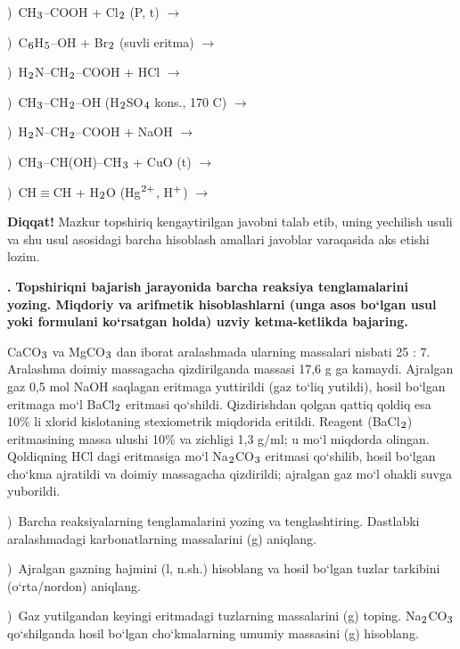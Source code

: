 \documentclass[11pt,a4paper]{article}
\renewcommand{\textsubscript}[1]{\ensuremath{_{\text{\fontsize{8}{8}\selectfont #1}}}}
\renewcommand{\textsuperscript}[1]{\ensuremath{^{\text{\fontsize{8}{8}\selectfont #1}}}}
\newcommand{\qn}[1]{\textbf{\fontsize{11.5}{13}\selectfont #1}}
\newcommand{\qsep}{\par\vspace{13pt}}
\newcommand{\diqqat}[1]{\par\smallskip\noindent\textbf{Diqqat!} #1\par\medskip}
\begin{document}
)\ CH\textsubscript{3}--COOH + Cl\textsubscript{2} (P, t) $\to$\par
{})\ C\textsubscript{6}H\textsubscript{5}--OH + Br\textsubscript{2} (suvli eritma) $\to$\par
{})\ H\textsubscript{2}N--CH\textsubscript{2}--COOH + HCl $\to$\par
{})\ CH\textsubscript{3}--CH\textsubscript{2}--OH (H\textsubscript{2}SO\textsubscript{4} kons., 170 \textdegree{}C) $\to$\par
{})\ H\textsubscript{2}N--CH\textsubscript{2}--COOH + NaOH $\to$\par
{})\ CH\textsubscript{3}--CH(OH)--CH\textsubscript{3} + CuO (t) $\to$\par
{})\ CH$\equiv$CH + H\textsubscript{2}O (Hg\textsuperscript{2+}, H\textsuperscript{+}) $\to$\par
\diqqat{Mazkur topshiriq kengaytirilgan javobni talab etib, uning yechilish usuli va shu usul asosidagi barcha hisoblash amallari javoblar varaqasida aks etishi lozim.}\qsep
\noindent\qn{43.} \textbf{Topshiriqni bajarish jarayonida barcha reaksiya tenglamalarini yozing. Miqdoriy va arifmetik hisoblashlarni (unga asos bo`lgan usul yoki formulani ko`rsatgan holda) uzviy ketma-ketlikda bajaring.}\par\smallskip
CaCO\textsubscript{3} va MgCO\textsubscript{3} dan iborat aralashmada ularning massalari nisbati 25 : 7. Aralashma doimiy massagacha qizdirilganda massasi 17,6 g ga kamaydi. Ajralgan gaz 0,5 mol NaOH saqlagan eritmaga yuttirildi (gaz to`liq yutildi), hosil bo`lgan eritmaga mo`l BaCl\textsubscript{2} eritmasi qo`shildi. Qizdirishdan qolgan qattiq qoldiq esa 10\% li xlorid kislotaning stexiometrik miqdorida eritildi. Reagent (BaCl\textsubscript{2}) eritmasining massa ulushi 10\% va zichligi 1,3 g/ml; u mo`l miqdorda olingan. Qoldiqning HCl dagi eritmasiga mo`l Na\textsubscript{2}CO\textsubscript{3} eritmasi qo`shilib, hosil bo`lgan cho`kma ajratildi va doimiy massagacha qizdirildi; ajralgan gaz mo`l ohakli suvga yuborildi.\par
{})\ Barcha reaksiyalarning tenglamalarini yozing va tenglashtiring. Dastlabki aralashmadagi karbonatlarning massalarini (g) aniqlang.\par
{})\ Ajralgan gazning hajmini (l, n.sh.) hisoblang va hosil bo`lgan tuzlar tarkibini (o`rta/nordon) aniqlang.\par
{})\ Gaz yutilgandan keyingi eritmadagi tuzlarning massalarini (g) toping. Na\textsubscript{2}CO\textsubscript{3} qo`shilganda hosil bo`lgan cho`kmalarning umumiy massasini (g) hisoblang.\par
\end{document}
